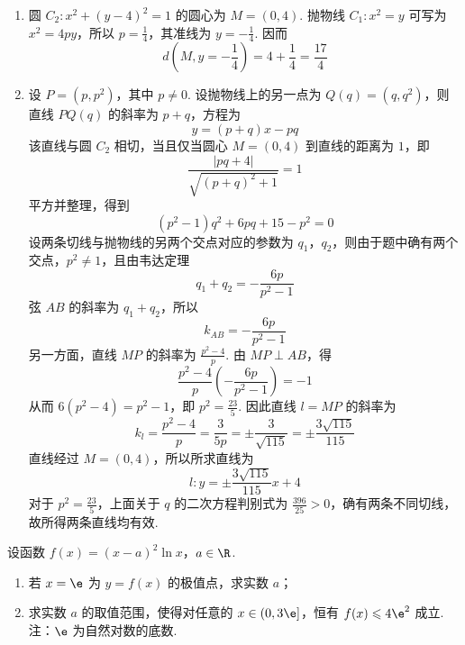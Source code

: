 \begin{solution}
\begin{enumerate}
\item
圆 \(C_2:x^2+(y-4)^2=1\) 的圆心为 \(M=(0,4)\). 抛物线 \(C_1:x^2=y\) 可写为 \(x^2=4py\)，所以 \(p=\frac{1}{4}\)，其准线为 \(y=-\frac{1}{4}\). 因而
\[
d\left(M,y=-\frac{1}{4}\right)=4+\frac{1}{4}=\frac{17}{4}
\]

\item
设 \(P=(p,p^2)\)，其中 \(p\neq0\). 设抛物线上的另一点为 \(Q(q)=(q,q^2)\)，则直线 \(PQ(q)\) 的斜率为 \(p+q\)，方程为
\[
y=(p+q)x-pq
\]
该直线与圆 \(C_2\) 相切，当且仅当圆心 \(M=(0,4)\) 到直线的距离为 \(1\)，即
\[
\frac{|pq+4|}{\sqrt{(p+q)^2+1}}=1
\]
平方并整理，得到
\[
(p^2-1)q^2+6pq+15-p^2=0
\]
设两条切线与抛物线的另两个交点对应的参数为 \(q_1\)，\(q_2\)，则由于题中确有两个交点，\(p^2\neq1\)，且由韦达定理
\[
q_1+q_2=-\frac{6p}{p^2-1}
\]
弦 \(AB\) 的斜率为 \(q_1+q_2\)，所以
\[
k_{AB}=-\frac{6p}{p^2-1}
\]
另一方面，直线 \(MP\) 的斜率为 \(\frac{p^2-4}{p}\). 由 \(MP\perp AB\)，得
\[
\frac{p^2-4}{p}\left(-\frac{6p}{p^2-1}\right)=-1
\]
从而 \(6(p^2-4)=p^2-1\)，即 \(p^2=\frac{23}{5}\). 因此直线 \(l=MP\) 的斜率为
\[
k_l=\frac{p^2-4}{p}=\frac{3}{5p}=\pm\frac{3}{\sqrt{115}}=\pm\frac{3\sqrt{115}}{115}
\]
直线经过 \(M=(0,4)\)，所以所求直线为
\[
l:y=\pm\frac{3\sqrt{115}}{115}x+4
\]
对于 \(p^2=\frac{23}{5}\)，上面关于 \(q\) 的二次方程判别式为 \(\frac{396}{25}>0\)，确有两条不同切线，故所得两条直线均有效.
\end{enumerate}
\end{solution}

\begin{problem}
设函数 \(f(x) = (x - a)^2 \ln x\)，\(a \in \R\).
\begin{enumerate}
\item 若 \(x = \e\) 为 \(y = f(x)\) 的极值点，求实数 \(a\)；
\item 求实数 \(a\) 的取值范围，使得对任意的 \(x \in (0,3\e]\)，恒有 \(f(x) \leqslant 4\e^2\) 成立. 注：\(\e\) 为自然对数的底数.
\end{enumerate}
\end{problem}

